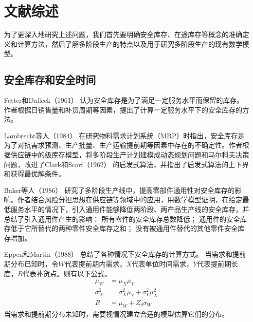 \chapter{文献综述}

为了更深入地研究上述问题，我们首先要明确安全库存、在途库存等概念的准确定义和计算方法，然后了解多阶段生产的特点以及用于研究多阶段生产的现有数学模型。






\section{安全库存和安全时间}

Fetter和Dalleck（1961） \cite{fetter_decision_1961} 认为安全库存是为了满足一定服务水平而保留的库存。作者根据日销售量和补货周期等因素，提出了计算一定服务水平下的安全库存的方法。

Lambrecht等人（1984） \cite{lambrecht_protective_1984} 在研究物料需求计划系统（MRP）时指出，安全库存是为了对抗需求预测、生产批量、生产运输提前期等因素中存在的不确定性。作者根据供应链中的级库存模型，将多阶段生产计划建模成动态规划问题和马尔科夫决策问题，改进了Clark和Scarf（1962） \cite{clark_approximate_1962} 的启发式算法，并指出了启发式算法的上下界和获得最优解条件。

Baker等人（1986） \cite{baker_effect_1986} 研究了多阶段生产线中，提高零部件通用性对安全库存的影响。作者结合风险分担思想在供应链等领域中的应用，用数学模型证明，在给定最低服务水平的情况下，引入通用件能够降低两阶段、两产品生产线的安全库存，并总结了引入通用件产生的影响：
所有零件的安全库存总数降低；
通用件的安全库存低于它所替代的两种零件安全库存之和；
没有被通用件替代的其他零件安全库存增加。

Eppen和Martin（1988） \cite{eppen_determining_1988} 总结了各种情况下安全库存的计算方式。
当需求和提前期分布已知时，令$W$代表提前期内需求，$X$代表单位时间需求，$Y$代表提前期长度，$R$代表补货点。则有以下公式。
\begin{align}
\mu_W &= \mu_X \mu_Y \\
\sigma_W^2 &= \sigma_X^2 \mu_Y + \sigma_Y^2\mu_X^2 \\
R &= \mu_W + Z_\delta \sigma_W
\end{align}
当需求和提前期分布未知时，需要视情况建立合适的模型估算它们的分布。

